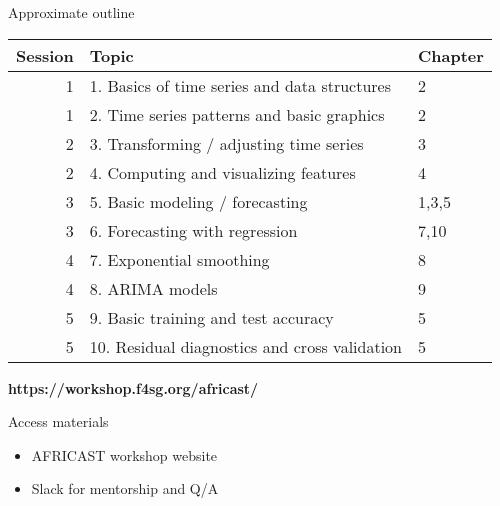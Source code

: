 \documentclass[
  14pt,
  ignorenonframetext,
  aspectratio=169,
]{beamer}
\providecommand{\tightlist}{%
  \setlength{\itemsep}{0pt}\setlength{\parskip}{0pt}}\usepackage{longtable,booktabs,array}
\begin{document}
\begin{frame}{Approximate outline}
\protect\hypertarget{approximate-outline}{}
\vspace*{-0.1cm}\centering\fontsize{12}{12}\sf
\begin{tabular}{rp{8.6cm}l}
  \bf Session & \bf Topic                   & \bf Chapter \\
  \midrule
  1       & 1. Basics of time series and data structures    & 2 \\
  1       & 2. Time series patterns and basic graphics      & 2 \\
  2       & 3. Transforming / adjusting time series         & 3 \\
  2       & 4. Computing and visualizing features     & 4 \\
  3       & 5. Basic modeling / forecasting & 1,3,5 \\
  3       & 6. Forecasting with regression         & 7,10 \\
  4       & 7. Exponential smoothing       & 8 \\
  4       & 8. ARIMA models                & 9 \\
  5       & 9. Basic training and test accuracy       & 5 \\
  5       & 10. Residual diagnostics and cross validation                & 5 \\
  \bottomrule
\end{tabular}

\vspace*{.0cm}\begin{alertblock}{}{\centerline{\Large\textbf{https://workshop.f4sg.org/africast/}}}
\end{alertblock}
\end{frame}

\begin{frame}{Access materials}
\protect\hypertarget{access-materials}{}
\begin{itemize}
\tightlist
\item
  AFRICAST workshop website
\item
  Slack for mentorship and Q/A
\end{itemize}
\end{frame}
\end{document}
